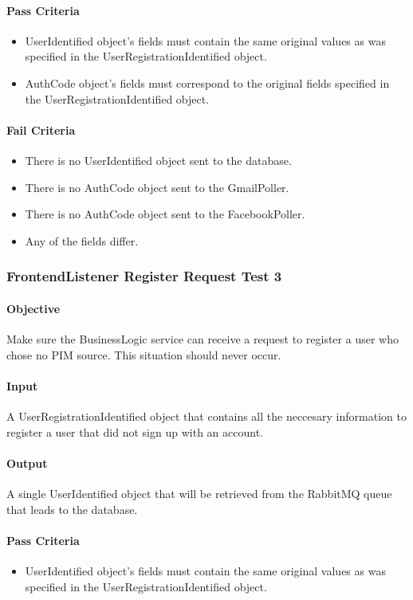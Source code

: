 \documentclass[hidelinks,english]{article}
\begin{document}
				\paragraph{Pass Criteria}
				\begin{itemize}
					\item UserIdentified object's fields must contain the same original values as was specified in the UserRegistrationIdentified object.
					\item AuthCode object's fields must correspond to the original fields specified in the UserRegistrationIdentified object.
				\end{itemize}
				\paragraph{Fail Criteria}
				\begin{itemize}
					\item There is no UserIdentified object sent to the database.
					\item There is no AuthCode object sent to the GmailPoller.
					\item There is no AuthCode object sent to the FacebookPoller.
					\item Any of the fields differ.
				\end{itemize}
			
			\subsubsection{FrontendListener Register Request Test 3}\label{businessfrontendlistenerregistertest3}
				\paragraph{Objective} Make sure the BusinessLogic service can receive a request to register a user who chose no PIM source. This situation should never occur.
				\paragraph{Input} A UserRegistrationIdentified object that contains all the neccesary information to register a user that did not sign up with an account.
				\paragraph{Output} A single UserIdentified object that will be retrieved from the RabbitMQ queue that leads to the database.
				\paragraph{Pass Criteria}
				\begin{itemize}
					\item UserIdentified object's fields must contain the same original values as was specified in the UserRegistrationIdentified object.
				\end{itemize}
\end{document}
